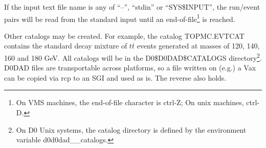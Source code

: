 \par
If the input text file name is any of ``--'', ``stdin'' or ``SYS\$INPUT'', 
the run/event
pairs will be read from the standard input until an end-of-file\footnote{
On VMS machines, the end-of-file character is ctrl-Z; On unix machines, ctrl-D.}
is reached.  

\par
Other catalogs may be created. For example, the catalog TOPMC.EVTCAT contains
the
standard decay mixture of $t\overline{t} $ events generated at masses of 120,
140, 160 and 180 GeV.  All catalogs will be in the D0\$D0DAD\$CATALOGS 
directory\footnote{On D0 Unix systems, the catalog directory is defined by the
environment variable d0d0dad\_\_catalogs.}.  D0DAD files are transportable 
across platforms, so a file written on (e.g.) a Vax can be copied via rcp
to an SGI and used as is.  The reverse also holds.


